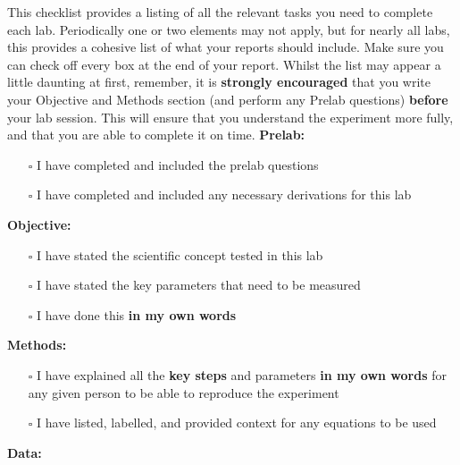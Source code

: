 This checklist provides a listing of all the relevant tasks you need to complete each lab. Periodically one or two elements may not apply, but for nearly all labs, this provides a cohesive list of what your reports should include. Make sure you can check off every box at the end of your report. Whilst the list may appear a little daunting at first, remember, it is \textbf{strongly encouraged} that you write your Objective and Methods section (and perform any Prelab questions) \textbf{before} your lab session. This will ensure that you understand the experiment more fully, and that you are able to complete it on time.
\newline
\newline
\textbf{Prelab:}
\begin{itemize}
    \item[$\square$] I have completed and included the prelab questions
    \item[$\square$] I have completed and included any necessary derivations for this lab
\end{itemize}    
\textbf{Objective:}
\begin{itemize}
    \item[$\square$] I have stated the scientific concept tested in this lab
    \item[$\square$] I have stated the key parameters that need to be measured
    \item[$\square$] I have done this \textbf{in my own words}
\end{itemize}
\textbf{Methods:}
\begin{itemize}
    \item[$\square$] I have explained all the \textbf{key steps} and parameters \textbf{in my own words} for any given person to be able to reproduce the experiment
    \item[$\square$] I have listed, labelled, and provided context for any equations to be used
\end{itemize}  
\textbf{Data:}
